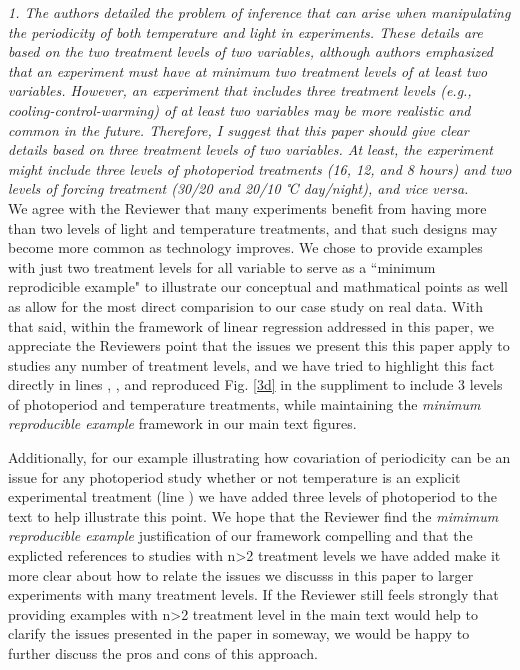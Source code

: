 \documentclass[11pt]{article}
\begin{document}
\emph{1. The authors detailed the problem of inference that can arise when manipulating the periodicity of both temperature and light in experiments. These details are based on the two treatment levels of two variables, although authors emphasized that an experiment must have at minimum two treatment levels of at least two variables. However, an experiment that includes three treatment levels (e.g., cooling-control-warming) of at least two variables may be more realistic and common in the future. Therefore, I suggest that this paper should give clear details based on three treatment levels of two variables. At least, the experiment might include three levels of photoperiod treatments (16, 12, and 8 hours) and two levels of forcing treatment (30/20 and 20/10 ℃ day/night), and vice versa.}\\

We agree with the Reviewer that many experiments benefit from having more than two levels of light and temperature treatments, and that such designs may become more common as technology improves. We chose to provide examples with just two treatment levels for all variable to serve as a ``minimum reprodicible example" to illustrate our conceptual and mathmatical points as well as allow for the most direct comparision to our case study on real data. With that said, within the framework of linear regression addressed in this paper, we appreciate the Reviewers point that the issues we present this this paper apply to studies any number of treatment levels, and we have tried to highlight this fact directly in lines , , and reproduced Fig. \ref{3d} in the suppliment to include 3 levels of photoperiod and temperature treatments,  while maintaining the \emph{minimum reproducible example} framework in our main text figures.

Additionally, for our example illustrating how covariation of periodicity can be an issue for any photoperiod study whether or not temperature is an explicit experimental treatment (line ) we have added three levels of photoperiod to the text to help illustrate this point.
We hope that the Reviewer find the \emph{mimimum reproducible example} justification of our framework compelling and that the explicted references to studies with n>2 treatment levels we have added make it more clear about how to relate the issues we discusss in this paper to larger experiments with many treatment levels. If the Reviewer still feels strongly that providing examples with n>2 treatment level in the main text would help to clarify the issues presented in the paper in someway, we would be happy to further discuss the pros and cons of this approach.
\end{document}
